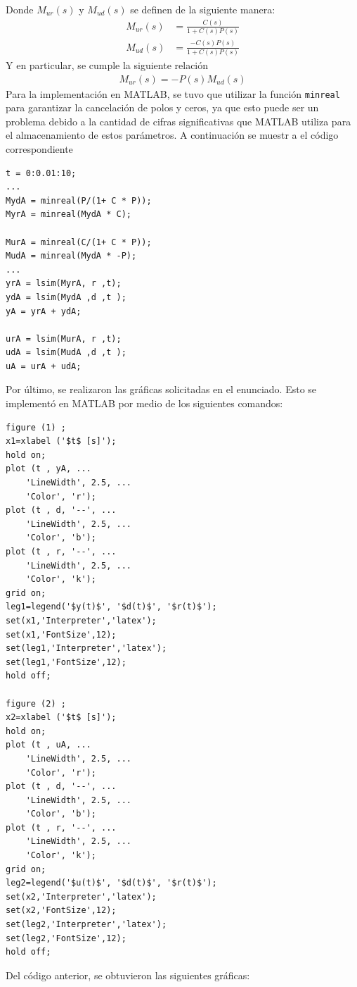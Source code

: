\begin{itemize}
Donde $M _{ur}(s)$ y $M _{ud}(s)$ se definen de la siguiente manera:
\begin{align*}
    M _{ur}(s) &= \frac{C(s)}{ 1 + C(s)P(s)}\\
    M _{ud}(s) &= \frac{-C(s)P(s)}{ 1 + C(s)P(s)}
\end{align*}
Y en particular, se cumple la siguiente relación
\begin{align*}
    M _{ur}(s) = -P(s)M _{ud}(s)
\end{align*}
Para la implementación en MATLAB, se tuvo que utilizar la función \texttt{minreal} para garantizar la cancelación de polos y ceros, ya que esto puede ser un problema debido a la cantidad de cifras significativas que MATLAB utiliza para el almacenamiento de estos parámetros. A continuación se muestr a el código correspondiente
\vspace{1em}
\begin{mdframed}
\begin{verbatim}
t = 0:0.01:10;
...
MydA = minreal(P/(1+ C * P));
MyrA = minreal(MydA * C);

MurA = minreal(C/(1+ C * P));
MudA = minreal(MydA * -P);
...
yrA = lsim(MyrA, r ,t);
ydA = lsim(MydA ,d ,t );
yA = yrA + ydA;

urA = lsim(MurA, r ,t);
udA = lsim(MudA ,d ,t );
uA = urA + udA;
\end{verbatim}
\end{mdframed}
Por último, se realizaron las gráficas solicitadas en el enunciado. Esto se implementó en MATLAB por medio de los siguientes comandos:

\vspace{1em}
\begin{mdframed}
\begin{verbatim}
figure (1) ;
x1=xlabel ('$t$ [s]');
hold on;
plot (t , yA, ...
    'LineWidth', 2.5, ...
    'Color', 'r');
plot (t , d, '--', ...
    'LineWidth', 2.5, ...
    'Color', 'b');
plot (t , r, '--', ...
    'LineWidth', 2.5, ...
    'Color', 'k');
grid on;
leg1=legend('$y(t)$', '$d(t)$', '$r(t)$');
set(x1,'Interpreter','latex');
set(x1,'FontSize',12);
set(leg1,'Interpreter','latex');
set(leg1,'FontSize',12);
hold off;

figure (2) ;
x2=xlabel ('$t$ [s]');
hold on;
plot (t , uA, ...
    'LineWidth', 2.5, ...
    'Color', 'r');
plot (t , d, '--', ...
    'LineWidth', 2.5, ...
    'Color', 'b');
plot (t , r, '--', ...
    'LineWidth', 2.5, ...
    'Color', 'k');
grid on;
leg2=legend('$u(t)$', '$d(t)$', '$r(t)$');
set(x2,'Interpreter','latex');
set(x2,'FontSize',12);
set(leg2,'Interpreter','latex');
set(leg2,'FontSize',12);
hold off;
\end{verbatim}
\end{mdframed}
Del código anterior, se obtuvieron las siguientes gráficas:


\end{itemize}
